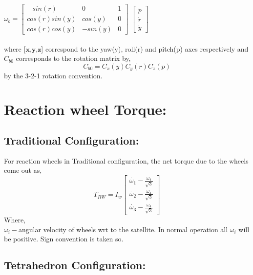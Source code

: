\documentclass[10pt,a4paper]{report}
\begin{document}
$
\omega_{b} =\begin{bmatrix}
-sin(r) & 0 & 1\\
cos(r) sin(y)&cos(y)&0\\
cos(r) cos(y)&-sin(y)&0
\end{bmatrix}
$ $
\begin{bmatrix}
\dot{p}\\ \dot{r} \\ \dot{y}
\end{bmatrix}
$\\ \\
where [$\textbf{x}$,$\textbf{y}$,$\textbf{z}$]  correspond to the yaw(y), roll(r) and pitch(p) axes respectively and $ C_{b0} $ corresponds to the rotation matrix by,
\begin{equation}
C_{b0}=C_{x}(y)C_{y}(r)C_{z}(p)
\end{equation}
by the 3-2-1 rotation convention.
\section{Reaction wheel Torque:}
\subsection{Traditional Configuration:}
For reaction wheels in Traditional configuration, the net torque due to the wheels come out as,
\begin{equation}
T_{RW}=I_{w}\begin{bmatrix}
\dot{\omega_{1}}-\frac{\omega_{4}}{\sqrt{3}}\\
\dot{\omega_{2}}-\frac{\omega_{4}}{\sqrt{3}}\\
\dot{\omega_{3}}-\frac{\omega_{4}}{\sqrt{3}}
\end{bmatrix}
\end{equation}
Where, \\
$\omega_{i}-$angular velocity of wheels wrt to the satellite. In normal operation all $\omega_{i}$ will be positive. Sign convention is taken so. \\


\subsection{Tetrahedron Configuration:}
\end{document}
